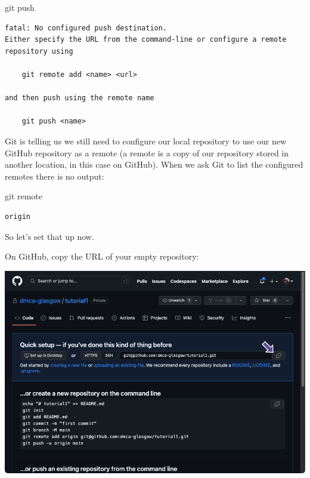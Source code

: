 \documentclass[
  letterpaper,
  DIV=11,
  numbers=noendperiod]{scrartcl}
\newenvironment{Shaded}{\begin{snugshade}}{\end{snugshade}}
\newcommand{\NormalTok}[1]{\textcolor[rgb]{0.00,0.23,0.31}{#1}}
\begin{document}
\begin{Shaded}
\begin{Highlighting}[]
\NormalTok{git push}
\end{Highlighting}
\end{Shaded}

\begin{verbatim}
fatal: No configured push destination.
Either specify the URL from the command-line or configure a remote repository using

    git remote add <name> <url>

and then push using the remote name

    git push <name>
\end{verbatim}

Git is telling us we still need to configure our local repository to use
our new GitHub repository as a remote (a remote is a copy of our
repository stored in another location, in this case on GitHub). When we
ask Git to list the configured remotes there is no output:

\begin{Shaded}
\begin{Highlighting}[]
\NormalTok{git remote}
\end{Highlighting}
\end{Shaded}

\begin{verbatim}
origin
\end{verbatim}

So let's set that up now.

On GitHub, copy the URL of your empty repository:

\includegraphics{images/image14.png}
\end{document}
